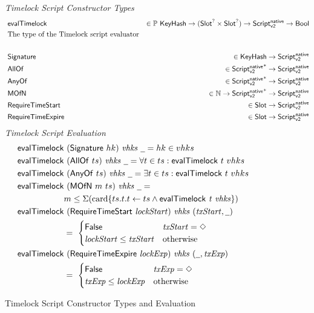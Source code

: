 \begin{figure*}[htb]
  \emph{Timelock Script Constructor Types}
  \begin{align*}
    & \mathsf{evalTimelock} & \in \mathbb{P}~\mathsf{KeyHash}\to(\mathsf{Slot}^? \times \mathsf{Slot}^?)\to\mathsf{Script^{native}_{v2}} \to \mathsf{Bool} & \\
    & \text{The type of the Timelock script evaluator} \\~\\
    & \mathsf{Signature} & \in \mathsf{KeyHash} \to \mathsf{Script^{native}_{v2}} & \\
    & \mathsf{AllOf} & \in \mathsf{Script^{native}_{v2}}^{*} \to \mathsf{Script^{native}_{v2}} & \\
    & \mathsf{AnyOf} & \in \mathsf{Script^{native}_{v2}}^{*} \to \mathsf{Script^{native}_{v2}} & \\
    & \mathsf{MOfN} & \in \mathbb{N} \to \mathsf{Script^{native}_{v2}}^{*} \to \mathsf{Script^{native}_{v2}} & \\
    & \mathsf{RequireTimeStart} & \in \mathsf{Slot} \to \mathsf{Script^{native}_{v2}} &\\
    & \mathsf{RequireTimeExpire} & \in \mathsf{Slot} \to \mathsf{Script^{native}_{v2}} &\\
  \end{align*}
  \emph{Timelock Script Evaluation}
  \begin{align*}
    \fun{evalTimelock} & ~(\type{Signature}~hk)~\var{vhks}~\wcard =  hk \in vhks \\
    \fun{evalTimelock} & ~(\type{AllOf}~ts)~\var{vhks}~\wcard =
                              \forall t \in ts: \fun{evalTimelock}~t~vhks\\
    \fun{evalTimelock} & ~(\type{AnyOf}~ts)~\var{vhks}~\wcard =
                              \exists t \in ts: \fun{evalTimelock}~t~vhks\\
    \fun{evalTimelock} & ~(\type{MOfN}~m~ts)~\var{vhks}~\wcard = \\
                             & m \leq \Sigma
                               (\textrm{card} \{ t s.t. t \leftarrow ts \wedge \fun{evalTimelock}~\var{t}~\var{vhks} \}) \\
    \fun{evalTimelock} &~(\type{RequireTimeStart}~\var{lockStart})~\var{vhks}~\var{(\var{txStart}, \wcard)} \\
    & =~
    \begin{cases}
      \False & \var{txStart} = \Nothing \\
      \var{lockStart} \leq \var{txStart} & \text{otherwise}
    \end{cases} \\
    \fun{evalTimelock} &~(\type{RequireTimeExpire}~\var{lockExp})~\var{vhks}~\var{(\wcard, \var{txExp})} \\
    & =~
    \begin{cases}
      \False & \var{txExp} = \Nothing \\
      \var{txExp} \leq \var{lockExp} & \text{otherwise}
    \end{cases} \\
  \end{align*}
  \caption{Timelock Script Constructor Types and Evaluation}
  \label{fig:defs:tx-mc-eval}
\end{figure*}


